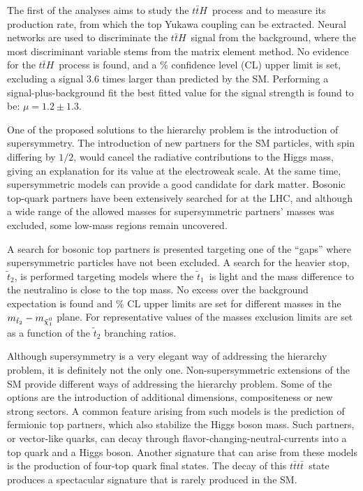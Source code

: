 \documentclass{article}
\newcommand\fourtop{{\ensuremath{t\bar{t}t\bar{t}}}}
\def\ttH{\ensuremath{t\bar{t}H}}
\def\stoptwo{\ensuremath{\tilde{t}_2}}
\def\stopone{\ensuremath{\tilde{t}_1}}
\def\neutralino{\ensuremath{\mathchoice%
      {\displaystyle\raise.4ex\hbox{$\displaystyle\tilde\chi^0_1$}}%
         {\textstyle\raise.4ex\hbox{$\textstyle\tilde\chi^0_1$}}%
       {\scriptstyle\raise.3ex\hbox{$\scriptstyle\tilde\chi^0_1$}}%
 {\scriptscriptstyle\raise.3ex\hbox{$\scriptscriptstyle\tilde\chi^0_1$}}}}
\begin{document}
The first of the analyses aims to study the \ttH\ process and to measure its production rate, from which the top Yukawa coupling can be extracted. Neural networks are used to discriminate the \ttH\ signal from the background, where the most discriminant variable stems from the matrix element method.
No evidence for the \ttH\ process is found, and a \unit[95]{\%} confidence level (CL) upper limit is set, excluding a signal 3.6 times larger than predicted by the SM. Performing a signal-plus-background fit the best fitted value for the signal strength is found to be: $\mu= 1.2 \pm 1.3$. 
\newline

One of the proposed solutions to the hierarchy problem is the introduction of supersymmetry. The introduction of new partners for the SM particles, with spin differing by $1/2$, would cancel the radiative contributions to the Higgs mass, giving an explanation for its value at the electroweak scale. At the same time, supersymmetric models can provide a good candidate for dark matter. Bosonic top-quark partners have been extensively searched for at the LHC, and although a wide range of the allowed masses for supersymmetric partners' masses was excluded, some low-mass regions remain uncovered.

A search for bosonic top partners is presented targeting one of the ``gaps'' where supersymmetric particles have not been excluded. A search for the heavier stop, \stoptwo, is performed targeting models where the \stopone\ is light and the mass difference to the neutralino is close to the top mass. No excess over the background expectation is found and \unit[95]{\%} CL upper limits are set for different masses in the  $m_{\stoptwo}-m_{\neutralino}$ plane. For representative values of the masses exclusion limits are set as a function
of the $\stoptwo$ branching ratios.
\newline

Although supersymmetry is a very elegant way of addressing the hierarchy problem, it is definitely not the only one. Non-supersymmetric extensions of the SM provide different ways of addressing the hierarchy problem. Some of the options are the introduction of additional dimensions, compositeness or new strong sectors. A common feature arising from such models is the prediction of fermionic top partners, which also stabilize the Higgs boson mass. Such partners, or vector-like quarks, can decay through flavor-changing-neutral-currents into a top quark and a Higgs boson. 
Another signature that can arise from these models is the production of four-top quark final states. The decay of this \fourtop\ state produces a spectacular signature that is rarely produced in the SM.
\end{document}
